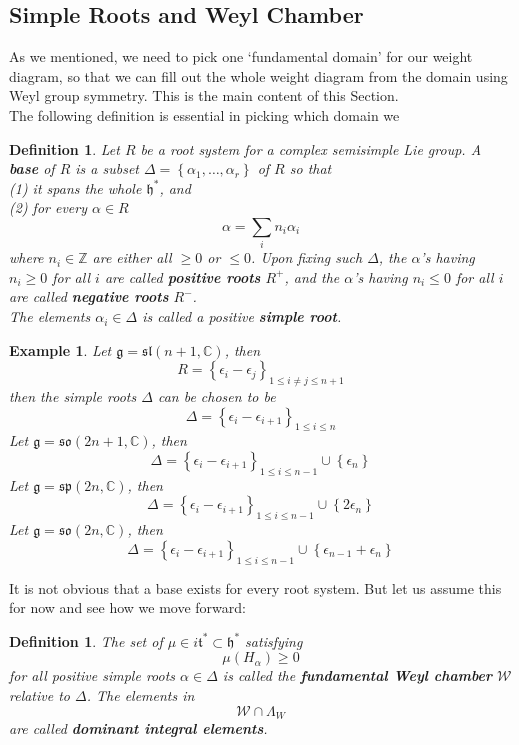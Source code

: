 \documentclass[11pt]{article}
\newtheorem{example}[theorem]{Example}
\newtheorem{definition}[theorem]{Definition}
\newcommand{\bb}[1]{\mathbb{#1}}
\newcommand{\mc}[1]{\mathcal{#1}}
\newcommand{\mf}[1]{\mathfrak{#1}}
\begin{document}
\subsection{Simple Roots and Weyl Chamber}
As we mentioned, we need to pick one `fundamental domain' for our weight diagram, so that we can fill out the whole weight diagram from the domain using Weyl group symmetry. This is the main content of this Section.\\
The following definition is essential in picking which domain we
\begin{definition}
Let $R$ be a root system for a complex semisimple Lie group. A \textbf{base} of $R$ is a subset $\Delta = \left\{\alpha_1, \dots, \alpha_r\right\}$ of $R$ so that\\
(1) it spans the whole $\mf{h}^*$, and \\
(2) for every $\alpha \in R$
$$\alpha = \sum_i n_i \alpha_i$$
where $n_i \in \bb{Z}$ are either all $\geq 0$ or $\leq 0$.
Upon fixing such $\Delta$, the $\alpha$'s having $n_i \geq 0$ for all $i$ are called \textbf{positive roots} $R^+$, and the $\alpha$'s having $n_i \leq 0$ for all $i$ are called \textbf{negative roots} $R^-$.\\
The elements $\alpha_i \in \Delta$ is called a positive \textbf{simple root}.
\end{definition}
\begin{example}
Let $\mf{g} = \mf{sl}(n+1,\bb{C})$, then
$$R = \left\{ \epsilon_i - \epsilon_j \right\}_{1 \leq i \neq j \leq n+1}$$
then the simple roots $\Delta$ can be chosen to be
$$\Delta = \left\{ \epsilon_i - \epsilon_{i+1} \right\}_{1 \leq i \leq n}$$
Let $\mf{g} = \mf{so}(2n+1,\bb{C})$, then
$$\Delta = \left\{ \epsilon_i - \epsilon_{i+1} \right\}_{1 \leq i \leq n-1} \cup \left\{\epsilon_{n}\right\}$$
Let $\mf{g} = \mf{sp}(2n,\bb{C})$, then
$$\Delta = \left\{ \epsilon_i - \epsilon_{i+1} \right\}_{1 \leq i \leq n-1} \cup \left\{2\epsilon_{n}\right\}$$
Let $\mf{g} = \mf{so}(2n,\bb{C})$, then
$$\Delta = \left\{ \epsilon_i - \epsilon_{i+1} \right\}_{1 \leq i \leq n-1} \cup \left\{\epsilon_{n-1}+ \epsilon_n \right\}$$
\end{example}
It is not obvious that a base exists for every root system. But let us assume this for now and see how we move forward:
\begin{definition}
The set of $\mu \in i\mf{t}^* \subset \mf{h}^*$ satisfying
$$\mu(H_{\alpha}) \geq 0$$
for all positive simple roots $\alpha \in \Delta$ is called the \textbf{fundamental Weyl chamber} $\mc{W}$ relative to $\Delta$. The elements in
$$\mc{W} \cap \Lambda_W$$
are called \textbf{dominant integral elements}.
\end{definition}
\end{document}
